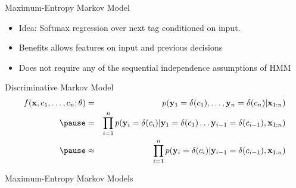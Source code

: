 \documentclass{beamer}
\begin{document}
\begin{frame}{Maximum-Entropy Markov Model}
  \begin{itemize}
  \item Idea: Softmax regression over next tag conditioned on input. 
    \air
    
  \item Benefits allows features on input and previous decisions
    \air
 
  \item Does not require any of the sequential independence assumptions of HMM
  \end{itemize}
\end{frame}

\begin{frame}{Discriminative Markov Model}
  \begin{eqnarray*}
    f(\boldx, c_1, \ldots, c_n; \theta) &=&  p(\boldy_1=\delta(c_1), \ldots, \boldy_n=\delta(c_n) | \boldx_{1:n})  \\ \pause
    &=& \prod_{i=1}^n p(\boldy_i=\delta(c_i) | \boldy_1=\delta(c_1) \ldots \boldy_{i-1}=\delta(c_{i-1}), \boldx_{1:n}) \\ \pause
    &\approx& \prod_{i=1}^n p(\boldy_i=\delta(c_i) | \boldy_{i-1}=\delta(c_{i-1}) , \boldx_{1:n}) \\
  \end{eqnarray*}
\end{frame}



\begin{frame}{Maximum-Entropy Markov Models}
\begin{center}  
\end{center}  
\end{frame}
\end{document}
